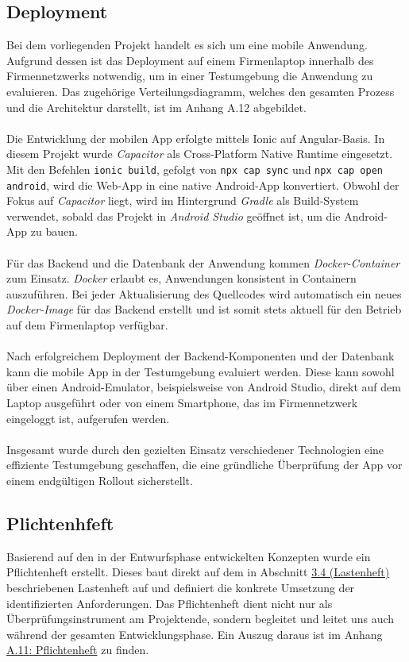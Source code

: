 \documentclass[a4paper,12pt]{article}
\begin{document}
\subsection{Deployment}
Bei dem vorliegenden Projekt handelt es sich um eine mobile Anwendung. Aufgrund dessen ist das Deployment auf einem Firmenlaptop innerhalb des Firmennetzwerks notwendig, um in einer Testumgebung die Anwendung zu evaluieren. Das zugehörige Verteilungsdiagramm, welches den gesamten Prozess und die Architektur darstellt, ist im Anhang A.12 abgebildet.\\
\\
Die Entwicklung der mobilen App erfolgte mittels Ionic auf Angular-Basis. In diesem Projekt wurde \textit{Capacitor} als Cross-Platform Native Runtime eingesetzt. Mit den Befehlen \texttt{ionic build}, gefolgt von \texttt{npx cap sync} und \texttt{npx cap open android}, wird die Web-App in eine native Android-App konvertiert. Obwohl der Fokus auf \textit{Capacitor} liegt, wird im Hintergrund \textit{Gradle} als Build-System verwendet, sobald das Projekt in \textit{Android Studio} geöffnet ist, um die Android-App zu bauen.
\\
\\
Für das Backend und die Datenbank der Anwendung kommen \textit{Docker-Container} zum Einsatz. \textit{Docker} erlaubt es, Anwendungen konsistent in Containern auszuführen. Bei jeder Aktualisierung des Quellcodes wird automatisch ein neues \textit{Docker-Image} für das Backend erstellt und ist somit stets aktuell für den Betrieb auf dem Firmenlaptop verfügbar.\\
\\
Nach erfolgreichem Deployment der Backend-Komponenten und der Datenbank kann die mobile App in der Testumgebung evaluiert werden. Diese kann sowohl über einen Android-Emulator, beispielsweise von Android Studio, direkt auf dem Laptop ausgeführt oder von einem Smartphone, das im Firmennetzwerk eingeloggt ist, aufgerufen werden.\\
\\
Insgesamt wurde durch den gezielten Einsatz verschiedener Technologien eine effiziente Testumgebung geschaffen, die eine gründliche Überprüfung der App vor einem endgültigen Rollout sicherstellt.


\subsection{Plichtenhfeft}
Basierend auf den in der Entwurfsphase entwickelten Konzepten wurde ein Pflichtenheft erstellt. Dieses baut direkt auf dem in Abschnitt \hyperref[sec:lastenheft]{3.4 (Lastenheft)} beschriebenen Lastenheft auf und definiert die konkrete Umsetzung der identifizierten Anforderungen. Das Pflichtenheft dient nicht nur als Überprüfungsinstrument am Projektende, sondern begleitet und leitet uns auch während der gesamten Entwicklungsphase. Ein Auszug daraus ist im Anhang \hyperref[sec:pflichtenheft]{A.11: Pflichtenheft} zu finden.
\end{document}
